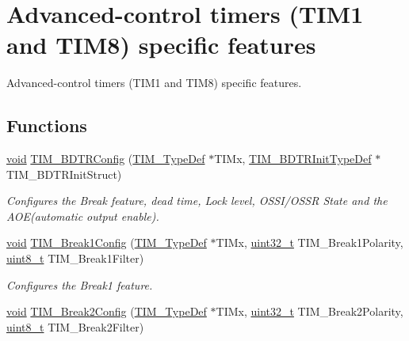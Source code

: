 \hypertarget{group___t_i_m___group4}{\section{Advanced-\/control timers (T\-I\-M1 and T\-I\-M8) specific features}
\label{group___t_i_m___group4}
}


Advanced-\/control timers (T\-I\-M1 and T\-I\-M8) specific features.  


\subsection*{Functions}
\begin{DoxyCompactItemize}
\item 
\hyperlink{group___n_a_m_e_ga18028b8badbf1ea7e704ccac3c488e82}{void} \hyperlink{group___t_i_m___group4_ga3df4ba3f0727f63ce621e2b2e6035d4f}{T\-I\-M\-\_\-\-B\-D\-T\-R\-Config} (\hyperlink{struct_t_i_m___type_def}{T\-I\-M\-\_\-\-Type\-Def} $\ast$T\-I\-Mx, \hyperlink{struct_t_i_m___b_d_t_r_init_type_def}{T\-I\-M\-\_\-\-B\-D\-T\-R\-Init\-Type\-Def} $\ast$T\-I\-M\-\_\-\-B\-D\-T\-R\-Init\-Struct)
\begin{DoxyCompactList}\small\item\em Configures the Break feature, dead time, Lock level, O\-S\-S\-I/\-O\-S\-S\-R State and the A\-O\-E(automatic output enable). \end{DoxyCompactList}\item 
\hyperlink{group___n_a_m_e_ga18028b8badbf1ea7e704ccac3c488e82}{void} \hyperlink{group___t_i_m___group4_ga6cc840b0be510f46cc04139229572d10}{T\-I\-M\-\_\-\-Break1\-Config} (\hyperlink{struct_t_i_m___type_def}{T\-I\-M\-\_\-\-Type\-Def} $\ast$T\-I\-Mx, \hyperlink{stdint_8h_a435d1572bf3f880d55459d9805097f62}{uint32\-\_\-t} T\-I\-M\-\_\-\-Break1\-Polarity, \hyperlink{stdint_8h_aba7bc1797add20fe3efdf37ced1182c5}{uint8\-\_\-t} T\-I\-M\-\_\-\-Break1\-Filter)
\begin{DoxyCompactList}\small\item\em Configures the Break1 feature. \end{DoxyCompactList}\item 
\hyperlink{group___n_a_m_e_ga18028b8badbf1ea7e704ccac3c488e82}{void} \hyperlink{group___t_i_m___group4_ga18e4673a59b33cb37dbf12f66dfb84ee}{T\-I\-M\-\_\-\-Break2\-Config} (\hyperlink{struct_t_i_m___type_def}{T\-I\-M\-\_\-\-Type\-Def} $\ast$T\-I\-Mx, \hyperlink{stdint_8h_a435d1572bf3f880d55459d9805097f62}{uint32\-\_\-t} T\-I\-M\-\_\-\-Break2\-Polarity, \hyperlink{stdint_8h_aba7bc1797add20fe3efdf37ced1182c5}{uint8\-\_\-t} T\-I\-M\-\_\-\-Break2\-Filter)

\end{DoxyCompactItemize}
